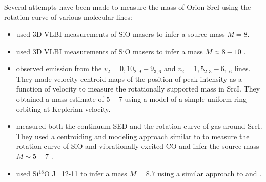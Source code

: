 \documentclass[twocolumn]{aastex61}
\newcommand{\sourcei}{SrcI\xspace}
\begin{document}
Several attempts have been made to measure the mass of Orion \sourcei using the
rotation curve of various molecular lines:
\begin{itemize}
    \item \citet{Kim2008a} used 3D VLBI measurements of SiO masers  to infer a
        source mass $M=8$\msun.
    \item \citet{Matthews2010a} used 3D VLBI measurements of SiO masers %
        to infer a mass $M\approx8-10$ \msun.
    \item \citet{Hirota2014a} observed \water emission
        from the $v_2=0, 10_{2,9}-9_{3,6}$ and  $v_2=1, 5_{2,3}-6_{1,6}$ lines.
        They made
        velocity centroid maps of the position of peak intensity
        as a function of velocity to measure the rotationally supported
        mass in \sourcei.  They obtained a mass estimate of $5-7$ \msun
        using a model of a simple uniform
        ring orbiting at Keplerian velocity.
    \item \citet{Plambeck2016a} measured both the continuum SED and the rotation
        curve of gas around \sourcei.  They used a centroiding and modeling approach
        similar to \citet{Hirota2014a} to measure the rotation curve of SiO and
        vibrationally excited CO and infer the source mass $M\sim5-7$ \msun.
    \item \citet{Hirota2017b} used Si$^{18}$O J=12-11 to infer a mass $M=8.7$
        using a similar approach to \citet{Hirota2014a} and \citet{Plambeck2016a}.
\end{itemize}

\end{document}
